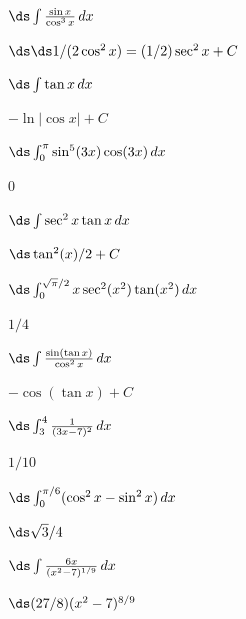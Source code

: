 \begin{enumialphparenastyle}
\begin{ex}
 $\ds\int {\sin x\over\cos^3 x}\,dx$
\begin{sol}
 $\ds \ds 1/(2\cos^2 x)=(1/2)\sec^2x+C$
\end{sol}
\end{ex}

\begin{ex}
 $\ds\int\tan x\,dx$
\begin{sol}
 $-\ln|\cos x|+C$
\end{sol}
\end{ex}

\begin{ex}
  $\ds\int_0^\pi\sin^5(3x)\cos(3x)\,dx$
\begin{sol}
 $0$
\end{sol}
\end{ex}

\begin{ex}
 $\ds\int\sec^2x\tan x\,dx$
\begin{sol}
 $\ds \tan^2(x)/2+C$
\end{sol}
\end{ex}

\begin{ex}
 $\ds\int_0^{\sqrt{\pi}/2} x\sec^2(x^2)\tan(x^2)\,dx$
\begin{sol}
 $1/4$
\end{sol}
\end{ex}

\begin{ex}
 $\ds\int {\sin(\tan x)\over\cos^2x}\,dx$
\begin{sol}
 $-\cos(\tan x)+C$
\end{sol}
\end{ex}

\begin{ex}
 $\ds\int_3^4 {1\over(3x-7)^2}\,dx$
\begin{sol}
 $1/10$
\end{sol}
\end{ex}

\begin{ex}
 $\ds\int_0^{\pi/6}(\cos^2x - \sin^2x)\,dx$
\begin{sol}
 $\ds \sqrt3/4$
\end{sol}
\end{ex}

\begin{ex}
 $\ds\int {6x\over(x^2 - 7)^{1/9}}\,dx$
\begin{sol}
 $\ds (27/8)(x^2-7)^{8/9}$
\end{sol}
\end{ex}


\end{enumialphparenastyle}
